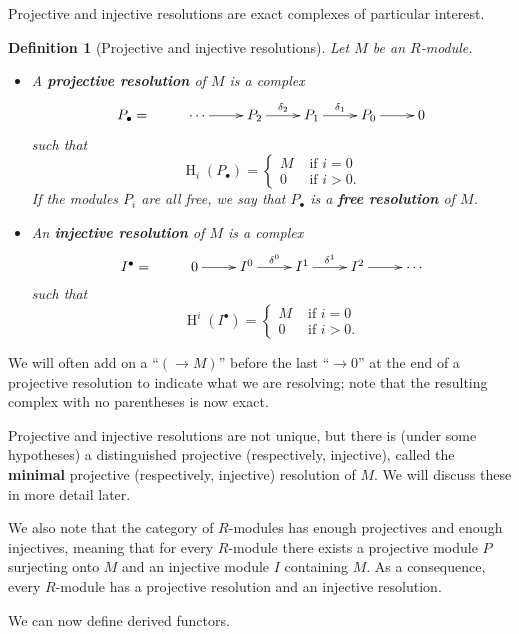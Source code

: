 \documentclass[11pt]{book}
\newtheorem{definition}[theorem]{Definition}
\numberwithin{equation}{section}
\numberwithin{theorem}{chapter}
\theoremstyle{definition}
\newtheorem*{basic properties}{Basic Properties}
\newtheorem*{Important Remark}{Important Remark}
\theoremstyle{remark}
\renewcommand{\H}{\operatorname{H}}
\begin{document}
Projective and injective resolutions are exact complexes of particular interest.

\begin{definition}[Projective and injective resolutions]
	Let $M$ be an $R$-module.
	\begin{itemize}
		\item A {\bf projective resolution} of $M$ is a complex
		$$\xymatrix{P_\bullet = & \cdots \ar[r] & P_{2} \ar[r]^-{\delta_{2}} & P_1 \ar[r]^{\delta_1} & P_{0} \ar[r] & 0}$$
		such that
		$$\H_i(P_\bullet) = 
		\left\lbrace \begin{array}{ll} M & \textrm{ if } i = 0 \\
		0 & \textrm{ if } i>0.
		\end{array} \right.$$
	If the modules $P_i$ are all free, we say that $P_\bullet$ is a {\bf free resolution} of $M$.
		\item An {\bf injective resolution} of $M$ is a complex
		$$\xymatrix{I^\bullet = & 0 \ar[r] & I^{0} \ar[r]^-{\delta^{0}} & I^1 \ar[r]^{\delta^1} & I^{2} \ar[r] & \cdots}$$
		such that
		$$\H^i(I^\bullet) = 
		\left\lbrace \begin{array}{ll} M & \textrm{ if } i = 0 \\
		0 & \textrm{ if } i>0.
		\end{array} \right.$$
	\end{itemize}
	\end{definition}

We will often add on a ``$(\to M)$'' before the last ``$\to 0$'' at the end of a projective resolution to indicate what we are resolving; note that the resulting complex with no parentheses is now exact.
	
Projective and injective resolutions are not unique, but there is (under some hypotheses) a distinguished projective (respectively, injective), called the {\bf minimal} projective (respectively, injective) resolution of $M$. We will discuss these in more detail later.

We also note that the category of $R$-modules has enough projectives and enough injectives, meaning that for every $R$-module there exists a projective module $P$ surjecting onto $M$ and an injective module $I$ containing $M$. As a consequence, every $R$-module has a projective resolution and an injective resolution.

We can now define derived functors.
\end{document}
